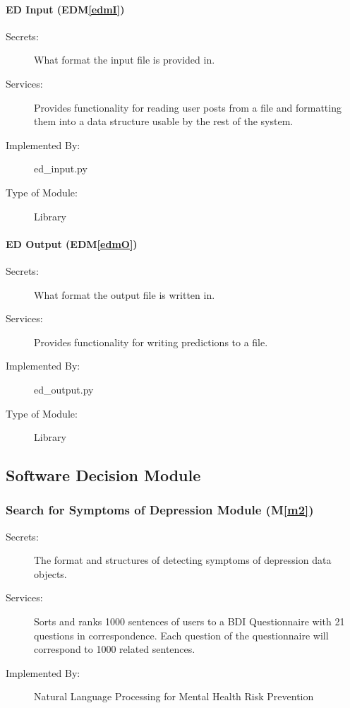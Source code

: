\documentclass[12pt, titlepage]{article}
\newcommand{\mref}[1]{M\ref{#1}}
\newcommand{\edmref}[1]{EDM\ref{#1}}
\begin{document}
\paragraph{ED Input (\edmref{edmI})}
\begin{description}
\item[Secrets:]What format the input file is provided in.
\item[Services:] Provides functionality for reading user posts from a file and formatting them into a data structure usable by the rest of the system.
\item[Implemented By:] ed\_input.py
\item[Type of Module:] Library
\end{description}

\paragraph{ED Output (\edmref{edmO})}
\begin{description}
\item[Secrets:]What format the output file is written in.
\item[Services:] Provides functionality for writing predictions to a file.
\item[Implemented By:] ed\_output.py
\item[Type of Module:] Library
\end{description}

\subsection{Software Decision Module}
\subsubsection{Search for Symptoms of Depression Module (\mref{m2})}
\begin{description}
\item[Secrets:]The format and structures of detecting symptoms of depression data objects.
\item[Services:] Sorts and ranks 1000 sentences of users to a BDI Questionnaire with 21 questions in correspondence. Each question of the questionnaire will correspond to 1000 related sentences.
\item[Implemented By:] Natural Language Processing for Mental Health Risk Prevention
\end{description}
\end{document}

